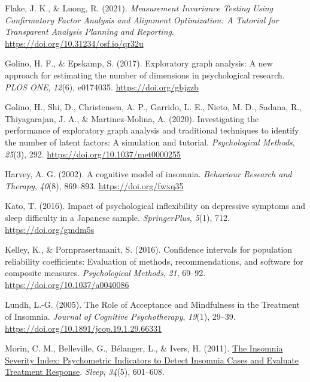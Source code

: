 \documentclass[
  letterpaper,
  DIV=11,
  numbers=noendperiod]{scrreprt}
\newlength{\cslhangindent}
\newlength{\cslentryspacingunit} %
\newenvironment{CSLReferences}[2] %
 {%
  \setlength{\parindent}{0pt}
  \ifodd #1
  \let\oldpar\par
  \def\par{\hangindent=\cslhangindent\oldpar}
  \fi
  \setlength{\parskip}{#2\cslentryspacingunit}
 }%
 {}
\begin{document}
\begin{CSLReferences}{1}{0}
\leavevmode{}%
Flake, J. K., \& Luong, R. (2021). \emph{Measurement {Invariance Testing
Using Confirmatory Factor Analysis} and {Alignment Optimization}: {A
Tutorial} for {Transparent Analysis Planning} and {Reporting}}.
\url{https://doi.org/10.31234/osf.io/qr32u}

\leavevmode{}%
Golino, H. F., \& Epskamp, S. (2017). Exploratory graph analysis: {A}
new approach for estimating the number of dimensions in psychological
research. \emph{PLOS ONE}, \emph{12}(6), e0174035.
\url{https://doi.org/gbjzzb}

\leavevmode{}%
Golino, H., Shi, D., Christensen, A. P., Garrido, L. E., Nieto, M. D.,
Sadana, R., Thiyagarajan, J. A., \& Martinez-Molina, A. (2020).
Investigating the performance of exploratory graph analysis and
traditional techniques to identify the number of latent factors: A
simulation and tutorial. \emph{Psychological Methods}, \emph{25}(3),
292. \url{https://doi.org/10.1037/met0000255}

\leavevmode{}%
Harvey, A. G. (2002). A cognitive model of insomnia. \emph{Behaviour
Research and Therapy}, \emph{40}(8), 869--893.
\url{https://doi.org/fwxq35}

\leavevmode{}%
Kato, T. (2016). Impact of psychological inflexibility on depressive
symptoms and sleep difficulty in a {Japanese} sample.
\emph{SpringerPlus}, \emph{5}(1), 712. \url{https://doi.org/gmdm5s}

\leavevmode{}%
Kelley, K., \& Pornprasertmanit, S. (2016). Confidence intervals for
population reliability coefficients: {Evaluation} of methods,
recommendations, and software for composite measures.
\emph{Psychological Methods}, \emph{21}, 69--92.
\url{https://doi.org/10.1037/a0040086}

\leavevmode{}%
Lundh, L.-G. (2005). The {Role} of {Acceptance} and {Mindfulness} in the
{Treatment} of {Insomnia}. \emph{Journal of Cognitive Psychotherapy},
\emph{19}(1), 29--39. \url{https://doi.org/10.1891/jcop.19.1.29.66331}

\leavevmode{}%
Morin, C. M., Belleville, G., Bélanger, L., \& Ivers, H. (2011).
\href{https://www.ncbi.nlm.nih.gov/pmc/articles/PMC3079939}{The
{Insomnia Severity Index}: {Psychometric Indicators} to {Detect Insomnia
Cases} and {Evaluate Treatment Response}}. \emph{Sleep}, \emph{34}(5),
601--608.


\end{CSLReferences}
\end{document}
